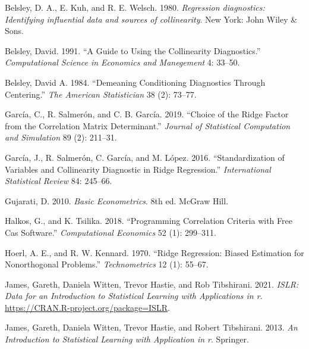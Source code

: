 \hypertarget{refs}{}
\begin{CSLReferences}{1}{0}
\leavevmode{}%
Belsley, D. A., E. Kuh, and R. E. Welsch. 1980. \emph{{Regression diagnostics: Identifying influential data and sources of collinearity}}. New York: John Wiley \& Sons.

\leavevmode{}%
Belsley, David. 1991. {``A Guide to Using the Collinearity Diagnostics.''} \emph{Computational Science in Economics and Manegement} 4: 33--50.

\leavevmode{}%
Belsley, David A. 1984. {``Demeaning Conditioning Diagnostics Through Centering.''} \emph{The American Statistician} 38 (2): 73--77.

\leavevmode{}%
García, C., R. Salmerón, and C. B. García. 2019. {``Choice of the Ridge Factor from the Correlation Matrix Determinant.''} \emph{Journal of Statistical Computation and Simulation} 89 (2): 211--31.

\leavevmode{}%
García, J., R. Salmerón, C. García, and M. López. 2016. {``Standardization of Variables and Collinearity Diagnostic in Ridge Regression.''} \emph{International Statistical Review} 84: 245--66.

\leavevmode{}%
Gujarati, D. 2010. \emph{{Basic Econometrics}}. 8th ed. McGraw Hill.

\leavevmode{}%
Halkos, G., and K. Tsilika. 2018. {``Programming Correlation Criteria with Free Cas Software.''} \emph{Computational Economics} 52 (1): 299--311.

\leavevmode{}%
Hoerl, A. E., and R. W. Kennard. 1970. {``Ridge Regression: Biased Estimation for Nonorthogonal Problems.''} \emph{Technometrics} 12 (1): 55--67.

\leavevmode{}%
James, Gareth, Daniela Witten, Trevor Hastie, and Rob Tibshirani. 2021. \emph{ISLR: Data for an Introduction to Statistical Learning with Applications in r}. \url{https://CRAN.R-project.org/package=ISLR}.

\leavevmode{}%
James, Gareth, Daniela Witten, Trevor Hastie, and Robert Tibshirani. 2013. \emph{An Introduction to Statistical Learning with Application in r}. Springer.


\end{CSLReferences}
